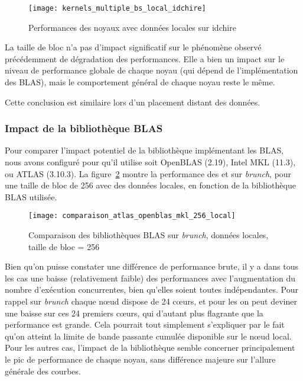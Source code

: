 \begin{figure}[ht]
  \centering
  \texttt{[image: kernels\_multiple\_bs\_local\_idchire]}
  \caption{Performances des noyaux avec données locales sur idchire}\label{fig:contribs:apps:cholesky:perf-multiple-bs-idchire}
\end{figure}

La taille de bloc n'a pas d'impact significatif sur le phénomène observé précédemment de dégradation des performances.
Elle a bien un impact sur le niveau de performance globale de chaque noyau (qui dépend de l'implémentation des BLAS), mais le comportement général de chaque noyau reste le même.

Cette conclusion est similaire lors d'un placement distant des données.


\subsubsection{Impact de la bibliothèque BLAS}

Pour comparer l'impact potentiel de la bibliothèque implémentant les BLAS, nous avons configuré \outil pour qu'il utilise soit OpenBLAS (2.19), Intel MKL (11.3), ou ATLAS (3.10.3).
La figure~\ref{fig:contribs:apps:cholesky:perf-blas} montre la performance des \gemm et \potrf sur \emph{brunch}, pour une taille de bloc de 256 avec des données locales, en fonction de la bibliothèque BLAS utilisée.

\begin{figure}[ht]
  \centering
  \texttt{[image: comparaison\_atlas\_openblas\_mkl\_256\_local]}
  \caption{Comparaison des bibliothèques BLAS sur \emph{brunch}, données locales, taille de bloc = 256}\label{fig:contribs:apps:cholesky:perf-blas}
\end{figure}

Bien qu'on puisse constater une différence de performance brute, il y a dans tous les cas une baisse (relativement faible) des performances avec l'augmentation du nombre d'exécution concurrentes, bien qu'elles soient toutes indépendantes.
Pour rappel sur \emph{brunch} chaque nœud dispose de 24 cœurs, et pour les \gemm on peut deviner une baisse sur ces 24 premiers cœurs, qui d'autant plus flagrante que la performance est grande.
Cela pourrait tout simplement s'expliquer par le fait qu'on atteint la limite de bande passante cumulée disponible sur le nœud local.
Pour les autres cas, l'impact de la bibliothèque semble concerner principalement le pic de performance de chaque noyau, sans différence majeure sur l'allure générale des courbes.

